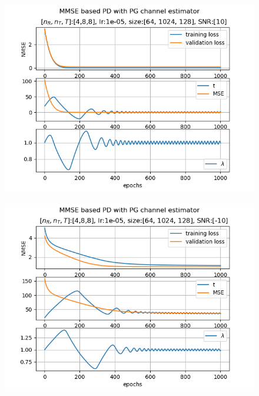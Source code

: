 \documentclass[journal,10pt,twocolumn]{IEEEtran}
\begin{document}
        \begin{figure}[h]
            \includegraphics[width=\linewidth]{figures/lr1e-05_[64, 1024, 128]_ep1000_SNR_[10].png}
        \end{figure}
        \begin{figure}[h]
            \includegraphics[width=\linewidth]{figures/lr1e-05_[64, 1024, 128]_ep1000_SNR_[-10].png}
        \end{figure}
\end{document}
